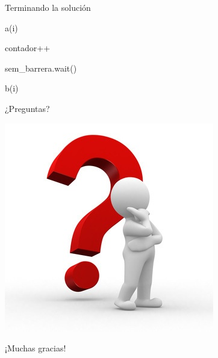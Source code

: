 \documentclass[pdf]{beamer}
\begin{document}
\begin{frame}{Terminando la solución}
    \begin{algorithmic}
            \State a(i)
            
            \vspace{1em}
                \State contador++
                    
                \EndIf
            
            \vspace{1em}
            
            \State sem\_barrera.wait()
            
            \vspace{1em}
            
            \State b(i)
            
        \EndFunction
        
        
    \end{algorithmic}

\end{frame}


\begin{frame}
    \huge{¿Preguntas?}
    \begin{center}
        \includegraphics[scale=0.4]{img/question-mark.jpg}
    \end{center}
    \large{¡Muchas gracias!}
\end{frame}
\end{document}
